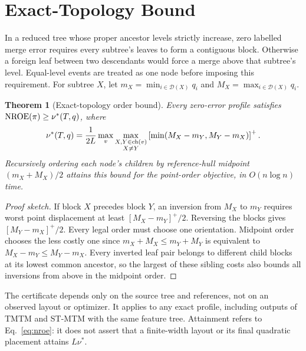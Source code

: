 \documentclass[10pt]{article}
\newtheorem{theorem}{Theorem}\newtheorem{lemma}{Lemma}\newtheorem{proposition}{Proposition}
\begin{document}
\section{Exact-Topology Bound}\label{sec:exact}
In a reduced tree whose proper ancestor levels strictly increase, zero labelled merge error requires every subtree's leaves to form a contiguous block. Otherwise a foreign leaf between two descendants would force a merge above that subtree's level. Equal-level events are treated as one node before imposing this requirement. For subtree $X$, let $m_X=\min_{i\in\mathcal{D}(X)}q_i$ and $M_X=\max_{i\in\mathcal{D}(X)}q_i$.

\begin{theorem}[Exact-topology order bound]\label{thm:order}
Every zero-error profile satisfies $\mathrm{NROE}(\pi)\ge\nu^*(T,q)$, where
\begin{equation}\label{eq:nu}
 \nu^*(T,q)=\frac{1}{2L}\max_v\max_{\substack{X,Y\in\mathrm{ch}(v)\\X\ne Y}}
 \left[\min(M_X-m_Y,M_Y-m_X)\right]^+.
\end{equation}
Recursively ordering each node's children by reference-hull midpoint $(m_X+M_X)/2$ attains this bound for the point-order objective, in $O(n\log n)$ time.
\end{theorem}
\begin{proof}[Proof sketch]
If block $X$ precedes block $Y$, an inversion from $M_X$ to $m_Y$ requires worst point displacement at least $[M_X-m_Y]^+/2$. Reversing the blocks gives $[M_Y-m_X]^+/2$. Every legal order must choose one orientation. Midpoint order chooses the less costly one since $m_X+M_X\le m_Y+M_Y$ is equivalent to $M_X-m_Y\le M_Y-m_X$. Every inverted leaf pair belongs to different child blocks at its lowest common ancestor, so the largest of these sibling costs also bounds all inversions from above in the midpoint order.
\end{proof}
The certificate depends only on the source tree and references, not on an observed layout or optimizer. It applies to any exact profile, including outputs of TMTM and ST-MTM with the same feature tree. Attainment refers to Eq.~\ref{eq:nroe}: it does not assert that a finite-width layout or its final quadratic placement attains $L\nu^*$.
\end{document}
